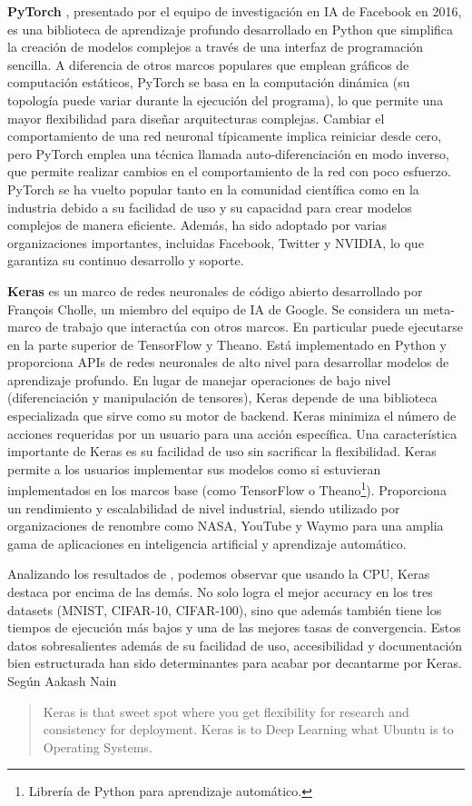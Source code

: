 \textbf{PyTorch} \citep{pytorch}, presentado por el equipo de investigación en IA de Facebook en 2016, es una biblioteca de aprendizaje profundo desarrollado en Python que simplifica la creación de modelos complejos a través de una interfaz de programación sencilla. A diferencia de otros marcos populares que emplean gráficos de computación estáticos, PyTorch se basa en la computación dinámica (su topología puede variar durante la ejecución del programa), lo que permite una mayor flexibilidad para diseñar arquitecturas complejas. Cambiar el comportamiento de una red neuronal típicamente implica reiniciar desde cero, pero PyTorch emplea una técnica llamada auto-diferenciación en modo inverso, que permite realizar cambios en el comportamiento de la red con poco esfuerzo. PyTorch se ha vuelto popular tanto en la comunidad científica como en la industria debido a su facilidad de uso y su capacidad para crear modelos complejos de manera eficiente. Además, ha sido adoptado por varias organizaciones importantes, incluidas Facebook, Twitter y NVIDIA, lo que garantiza su continuo desarrollo y soporte.


\textbf{Keras} \citep{keras} es un marco de redes neuronales de código abierto desarrollado por François Cholle, un miembro del equipo de IA de Google. Se considera un meta-marco de trabajo que interactúa con otros marcos. En particular puede ejecutarse en la parte superior de TensorFlow y Theano. Está implementado en Python y proporciona APIs de redes neuronales de alto nivel para desarrollar modelos de aprendizaje profundo. En lugar de manejar operaciones de bajo nivel (diferenciación y manipulación de tensores), Keras depende de una biblioteca especializada que sirve como su motor de backend. Keras minimiza el número de acciones requeridas por un usuario para una acción específica. Una característica importante de Keras es su facilidad de uso sin sacrificar la flexibilidad. Keras permite a los usuarios implementar sus modelos como si estuvieran implementados en los marcos base (como TensorFlow o Theano\footnote{Librería de Python para aprendizaje automático.}). Proporciona un rendimiento y escalabilidad de nivel industrial, siendo utilizado por organizaciones de renombre como NASA, YouTube y Waymo para una amplia gama de aplicaciones en inteligencia artificial y aprendizaje automático.


Analizando los resultados de \citep{mahmoud2019dlbench}, podemos observar que usando la CPU, Keras destaca por encima de las demás. No solo logra el mejor accuracy en los tres datasets (MNIST, CIFAR-10, CIFAR-100), sino que además también tiene los tiempos de ejecución más bajos y una de las mejores tasas de convergencia. Estos datos sobresalientes además de su facilidad de uso, accesibilidad y documentación bien estructurada han sido determinantes para acabar por decantarme por Keras. Según Aakash Nain \citep{keraswebsite2} \begin{quote} Keras is that sweet spot where you get flexibility for research and consistency for deployment. Keras is to Deep Learning what Ubuntu is to Operating Systems. \end{quote}

